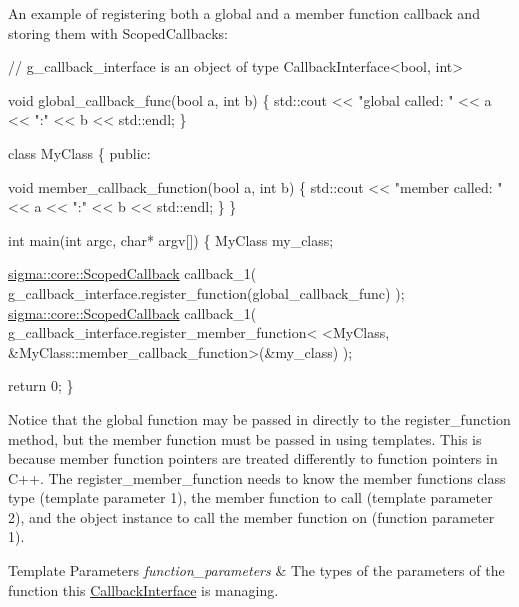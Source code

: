 An example of registering both a global and a member function callback and storing them with Scoped\+Callbacks\+:


\begin{DoxyCode}
\textcolor{comment}{// g\_callback\_interface is an object of type CallbackInterface<bool, int>}

\textcolor{keywordtype}{void} global\_callback\_func(\textcolor{keywordtype}{bool} a, \textcolor{keywordtype}{int} b)
\{
    std::cout << \textcolor{stringliteral}{"global called: "} << a << \textcolor{stringliteral}{":"} << b << std::endl;
\}

\textcolor{keyword}{class }MyClass
\{
\textcolor{keyword}{public}:

    \textcolor{keywordtype}{void} member\_callback\_function(\textcolor{keywordtype}{bool} a, \textcolor{keywordtype}{int} b)
    \{
        std::cout << \textcolor{stringliteral}{"member called: "} << a << \textcolor{stringliteral}{":"} << b << std::endl;
    \}
\}

\textcolor{keywordtype}{int} main(\textcolor{keywordtype}{int} argc, \textcolor{keywordtype}{char}* argv[])
\{
    MyClass my\_class;

    \hyperlink{classsigma_1_1core_1_1_scoped_callback}{sigma::core::ScopedCallback} callback\_1(
            g\_callback\_interface.register\_function(global\_callback\_func)
    );
    \hyperlink{classsigma_1_1core_1_1_scoped_callback}{sigma::core::ScopedCallback} callback\_1(
            g\_callback\_interface.register\_member\_function<
                    <MyClass, &MyClass::member\_callback\_function>(&my\_class)
    );

    \textcolor{keywordflow}{return} 0;
\}
\end{DoxyCode}


Notice that the global function may be passed in directly to the {\ttfamily register\+\_\+function method}, but the member function must be passed in using templates. This is because member function pointers are treated differently to function pointers in C++. The {\ttfamily register\+\_\+member\+\_\+function} needs to know the member functions class type (template parameter 1), the member function to call (template parameter 2), and the object instance to call the member function on (function parameter 1).


\begin{DoxyTemplParams}{Template Parameters}
{\em function\+\_\+parameters} & The types of the parameters of the function this \hyperlink{classsigma_1_1core_1_1_callback_interface}{Callback\+Interface} is managing. \\
\hline
\end{DoxyTemplParams}


